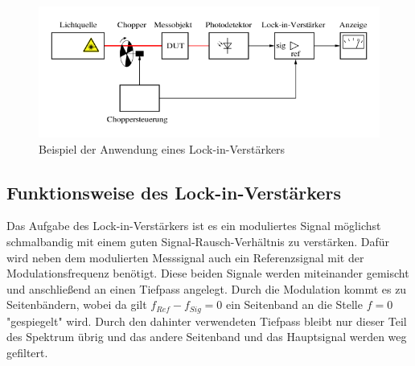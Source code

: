 \documentclass{scrartcl}						%
\begin{document}
	\begin{figure}[h!]
		\centering
		\includegraphics[scale=0.4]{650px-Messanordnung_Lock-in-Verstaerker.png}
		\caption{Beispiel der Anwendung eines Lock-in-Verstärkers}
	\end{figure}
	
	\subsection{Funktionsweise des Lock-in-Verstärkers}
	
	Das Aufgabe des Lock-in-Verstärkers ist es ein moduliertes Signal möglichst schmalbandig mit einem guten Signal-Rausch-Verhältnis zu verstärken. Dafür wird neben dem modulierten Messsignal auch ein Referenzsignal mit der Modulationsfrequenz benötigt. Diese beiden Signale werden miteinander gemischt und anschließend an einen Tiefpass angelegt. Durch die Modulation kommt es zu Seitenbändern, wobei da gilt $ f_{Ref} - f_{Sig} = 0 $ ein Seitenband an die Stelle $ f = 0 $ "gespiegelt" wird. Durch den dahinter verwendeten Tiefpass bleibt nur dieser Teil des Spektrum übrig und das andere Seitenband und das Hauptsignal werden weg gefiltert.
	\clearpage
	
	\begin{figure}[h!]
		\centering
	\end{figure}
\end{document}
